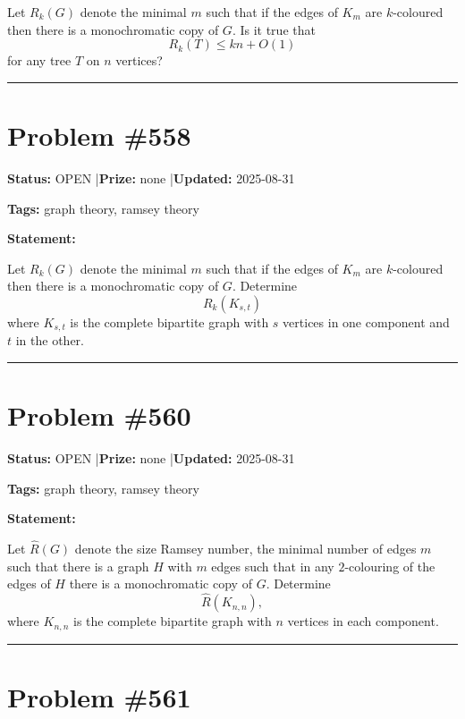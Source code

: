 \documentclass{article}
\begin{document}
Let $R_k(G)$ denote the minimal $m$ such that if the edges of $K_m$ are $k$-coloured then there is a monochromatic copy of $G$. Is it true that\[R_k(T)\leq kn+O(1)\]for any tree $T$ on $n$ vertices?

\noindent\rule{\linewidth}{0.4pt}


\section{Problem \#558}
\label{prob:558}

\noindent\textbf{Status:} OPEN \quad|\quad \textbf{Prize:} none \quad|\quad \textbf{Updated:} 2025-08-31

\noindent\textbf{Tags:} graph theory, ramsey theory

\medskip

\noindent\textbf{Statement:}

Let $R_k(G)$ denote the minimal $m$ such that if the edges of $K_m$ are $k$-coloured then there is a monochromatic copy of $G$. Determine\[R_k(K_{s,t})\]where $K_{s,t}$ is the complete bipartite graph with $s$ vertices in one component and $t$ in the other.

\noindent\rule{\linewidth}{0.4pt}


\section{Problem \#560}
\label{prob:560}

\noindent\textbf{Status:} OPEN \quad|\quad \textbf{Prize:} none \quad|\quad \textbf{Updated:} 2025-08-31

\noindent\textbf{Tags:} graph theory, ramsey theory

\medskip

\noindent\textbf{Statement:}

Let $\hat{R}(G)$ denote the size Ramsey number, the minimal number of edges $m$ such that there is a graph $H$ with $m$ edges such that in any $2$-colouring of the edges of $H$ there is a monochromatic copy of $G$. Determine\[\hat{R}(K_{n,n}),\]where $K_{n,n}$ is the complete bipartite graph with $n$ vertices in each component.

\noindent\rule{\linewidth}{0.4pt}


\section{Problem \#561}
\label{prob:561}
\end{document}
